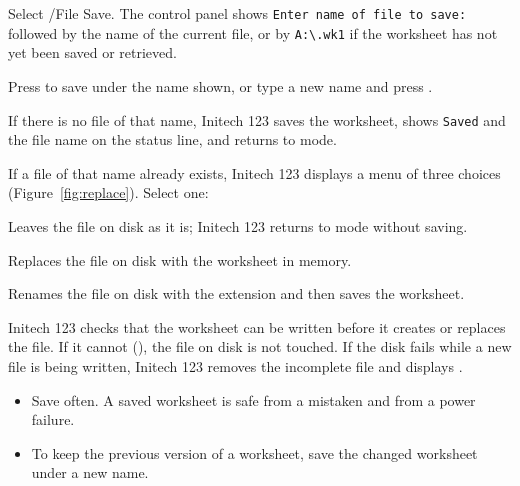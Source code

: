 \begin{Steps123}
\item Select /File Save.  The control panel shows
  \texttt{Enter name of file to save:} followed by the name of the current
  file, or by \texttt{A:\textbackslash *.wk1} if the worksheet has not yet
  been saved or retrieved.
\item Press  to save under the name shown, or type a new name
  and press .

  If there is no file of that name, Initech 123 saves the worksheet, shows
  \texttt{Saved} and the file name on the status line, and returns to
   mode.
\item If a file of that name already exists, Initech 123 displays a menu of
  three choices (Figure~\ref{fig:replace}).  Select one:
\begin{Options}
\item[\normalfont\bfseries Cancel\hfill] Leaves the file on disk as it is;
  Initech 123 returns to  mode without saving.
\item[\normalfont\bfseries Replace\hfill] Replaces the file on disk with
  the worksheet in memory.
\item[\normalfont\bfseries Backup\hfill]  Renames the file on disk with
  the extension  and then saves the worksheet.
\end{Options}
\end{Steps123}


\begin{Note}
Initech 123 checks that the worksheet can be written before it creates or
replaces the file.  If it cannot (), the
file on disk is not touched.  If the disk fails while a new file is being
written, Initech 123 removes the incomplete file and displays
.
\end{Note}

\begin{itemize}
\item Save often.  A saved worksheet is safe from a mistaken
   and from a power failure.
\item To keep the previous version of a worksheet, save the changed
  worksheet under a new name.
\end{itemize}

